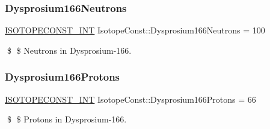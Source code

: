 \subsubsection{\texorpdfstring{Dysprosium166\+Neutrons}{Dysprosium166Neutrons}}
{\footnotesize\ttfamily \mbox{\hyperlink{group___isotope_const-_macros_ga5f18360b3e99483a35c32d789e62621c}{I\+S\+O\+T\+O\+P\+E\+C\+O\+N\+S\+T\+\_\+\+I\+NT}} Isotope\+Const\+::\+Dysprosium166\+Neutrons = 100}

\$ \$ Neutrons in Dysprosium-\/166. \mbox{\label{group___isotope_const-_dysprosium-_dy166_gab3e3404b127b27e2ebd3857dbc75af5d}} 
\subsubsection{\texorpdfstring{Dysprosium166\+Protons}{Dysprosium166Protons}}
{\footnotesize\ttfamily \mbox{\hyperlink{group___isotope_const-_macros_ga5f18360b3e99483a35c32d789e62621c}{I\+S\+O\+T\+O\+P\+E\+C\+O\+N\+S\+T\+\_\+\+I\+NT}} Isotope\+Const\+::\+Dysprosium166\+Protons = 66}

\$ \$ Protons in Dysprosium-\/166. 